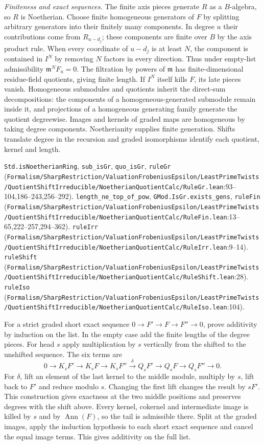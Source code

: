 \emph{Finiteness and exact sequences.} The finite axis pieces generate $R$ as a $B$-algebra, so $R$ is Noetherian. Choose finite homogeneous generators of $F$ by splitting arbitrary generators into their finitely many components. In degree $u$ their contributions come from $R_{u-d_j}$; these components are finite over $B$ by the axis product rule. When every coordinate of $u-d_j$ is at least $N$, the component is contained in $I^N$ by removing $N$ factors in every direction. Thus under empty-list admissibility $\mathfrak m^NF_u=0$. The filtration by powers of $\mathfrak m$ has finite-dimensional residue-field quotients, giving finite length. If $I^N$ itself kills $F$, its late pieces vanish. Homogeneous submodules and quotients inherit the direct-sum decompositions: the components of a homogeneous-generated submodule remain inside it, and projections of a homogeneous generating family generate the quotient degreewise. Images and kernels of graded maps are homogeneous by taking degree components. Noetherianity supplies finite generation. Shifts translate degree in the recursion and graded isomorphisms identify each quotient, kernel and length.

{\footnotesize \nolinkurl{Std.isNoetherianRing}, \nolinkurl{sub_isGr}, \nolinkurl{quo_isGr}, \nolinkurl{ruleGr} (\nolinkurl{Formalism/SharpRestriction/ValuationFrobeniusEpsilon/LeastPrimeTwists/QuotientShiftIrreducible/NoetherianQuotientCalc/RuleGr.lean}\allowbreak:93--104,186--243,256--292). \nolinkurl{length_ne_top_of_pow}, \nolinkurl{GMod.IsGr.exists_gens}, \nolinkurl{ruleFin} (\nolinkurl{Formalism/SharpRestriction/ValuationFrobeniusEpsilon/LeastPrimeTwists/QuotientShiftIrreducible/NoetherianQuotientCalc/RuleFin.lean}\allowbreak:13--65,222--257,294--362). \nolinkurl{ruleIrr} (\nolinkurl{Formalism/SharpRestriction/ValuationFrobeniusEpsilon/LeastPrimeTwists/QuotientShiftIrreducible/NoetherianQuotientCalc/RuleIrr.lean}\allowbreak:9--14). \nolinkurl{ruleShift} (\nolinkurl{Formalism/SharpRestriction/ValuationFrobeniusEpsilon/LeastPrimeTwists/QuotientShiftIrreducible/NoetherianQuotientCalc/RuleShift.lean}\allowbreak:28). \nolinkurl{ruleIso} (\nolinkurl{Formalism/SharpRestriction/ValuationFrobeniusEpsilon/LeastPrimeTwists/QuotientShiftIrreducible/NoetherianQuotientCalc/RuleIso.lean}\allowbreak:104).}

For a strict graded short exact sequence $0\to F'\to F\to F''\to0$, prove additivity by induction on the list. In the empty case add the finite lengths of the degree pieces. For head $s$ apply multiplication by $s$ vertically from the shifted to the unshifted sequence. The six terms are
\[
0\to K_sF'\to K_sF\to K_sF''\xrightarrow{\delta}Q_sF'\to Q_sF\to Q_sF''\to0 .
\]
For $\delta$, lift an element of the last kernel to the middle module, multiply by $s$, lift back to $F'$ and reduce modulo $s$. Changing the first lift changes the result by $sF'$. This construction gives exactness at the two middle positions and preserves degrees with the shift above. Every kernel, cokernel and intermediate image is killed by $s$ and by $\operatorname{Ann}(F)$, so the tail is admissible there. Split at the graded images, apply the induction hypothesis to each short exact sequence and cancel the equal image terms. This gives additivity on the full list.

